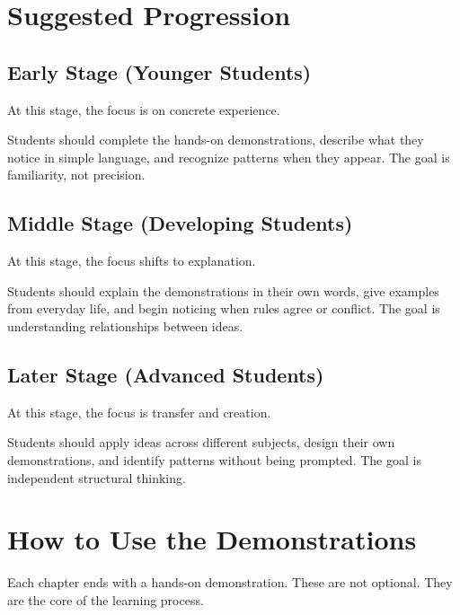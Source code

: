 \documentclass[12pt]{book}
\begin{document}
\section*{Suggested Progression}

\subsection*{Early Stage (Younger Students)}

At this stage, the focus is on concrete experience.

Students should complete the hands-on demonstrations, describe what they
notice in simple language, and recognize patterns when they appear. The
goal is familiarity, not precision.

\subsection*{Middle Stage (Developing Students)}

At this stage, the focus shifts to explanation.

Students should explain the demonstrations in their own words, give
examples from everyday life, and begin noticing when rules agree or
conflict. The goal is understanding relationships between ideas.

\subsection*{Later Stage (Advanced Students)}

At this stage, the focus is transfer and creation.

Students should apply ideas across different subjects, design their own
demonstrations, and identify patterns without being prompted. The goal
is independent structural thinking.

\section*{How to Use the Demonstrations}

Each chapter ends with a hands-on demonstration. These are not optional.
They are the core of the learning process.
\end{document}

